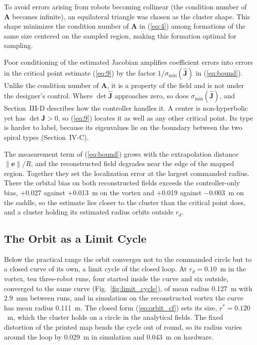 \documentclass[lettersize,journal]{IEEEtran}
\newcommand{\rev}[1]{#1}
\begin{document}
To avoid errors arising from robots becoming collinear (the condition number of $\mathbf{A}$ becomes infinite), an equilateral triangle was chosen as the cluster shape. This shape minimizes the condition number of $\mathbf{A}$ in (\ref{eq:4}) among formations of the same size centered on the sampled region, making this formation optimal for sampling.

Poor conditioning of the estimated Jacobian amplifies coefficient errors into errors in the critical point estimate (\ref{eq:9}) by the factor $1/\sigma_{\min}(\hat{\mathbf{J}})$ in (\ref{eq:bound}). Unlike the condition number of $\mathbf{A}$, it is a property of the field and is not under the designer's control. Where $\det\hat{\mathbf{J}}$ approaches zero, so does $\sigma_{\min}(\hat{\mathbf{J}})$, and Section~III-D describes how the controller handles it. A center is non-hyperbolic yet has $\det\mathbf{J} > 0$, so (\ref{eq:9}) locates it as well as any other critical point. Its type is harder to label, because its eigenvalues lie on the boundary between the two spiral types (Section~IV-C).

The measurement term of (\ref{eq:bound}) grows with the extrapolation distance $\|\mathbf{e}\|/R$, and the reconstructed field degrades near the edge of the mapped region. Together they set the localization error at the largest commanded radius. There the orbital bias on both reconstructed fields exceeds the controller-only bias, \rev{+0.027} against \rev{+0.013}~m on the vortex and \rev{+0.019} against \rev{$-$0.003}~m on the saddle, so the estimate lies closer to the cluster than the critical point does, and a cluster holding its estimated radius orbits outside $r_d$.

\subsection{The Orbit as a Limit Cycle}

Below the practical range the orbit converges not to the commanded circle but to a closed curve of its own, a limit cycle of the closed loop. At $r_d = 0.10$~m in the vortex, ten three-robot runs, four started inside the curve and six outside, converged to the same curve (Fig.~\ref{fig:limit_cycle}), of mean radius \rev{0.127}~m with \rev{2.9}~mm between runs, and in simulation on the reconstructed vortex the curve has mean radius \rev{0.111}~m. The closed form (\ref{eq:orbit_cf}) sets its size, $r^* = \rev{0.120}$~m, which the cluster holds on a circle in the analytical fields. The fixed distortion of the printed map bends the cycle out of round, so its radius varies around the loop by \rev{0.029}~m in simulation and \rev{0.043}~m on hardware.
\end{document}
